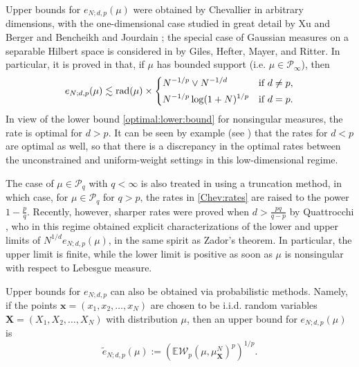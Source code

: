 \documentclass[11pt,reqno]{amsart}
\newcommand{\bx}{{\bm{x}}}
\newcommand{\bX}{{\boldsymbol X}}
\newcommand{\rad}{\mathrm{rad}}
\theoremstyle{definition}
\def\bx{{\boldsymbol x}}
\newcommand{\bm}[1]{\boldsymbol #1}
\renewcommand{\tilde}{\widetilde}
\renewcommand{\tilde}{\widetilde}
\newcommand{\EE}{{\mathbb E}}
\newcommand{\mcl}{\mathcal}
\theoremstyle{definition}
\numberwithin{equation}{section}
\numberwithin{lemma}{section}
\numberwithin{proposition}{section}
\numberwithin{theorem}{section}
\numberwithin{corollary}{section}
\numberwithin{definition}{section}
\numberwithin{remark}{section}
\begin{document}
Upper bounds for $e_{N;d,p}(\mu)$ were obtained by Chevallier \cite{Chev} in arbitrary dimensions, with the one-dimensional case studied in great detail by Xu and Berger \cite{BX} and Bencheikh and Jourdain \cite{BJ}; the special case of Gaussian measures on a separable Hilbert space is considered in \cite{GHMR1} by Giles, Hefter, Mayer, and Ritter. In particular, it is proved in \cite{Chev} that, if $\mu$ has bounded support (i.e. $\mu \in \mcl P_\infty$), then
\begin{equation}\label{Chev:rates}
	e_{N;d,p}(\mu)
	\lesssim \rad(\mu) \times
	\begin{dcases}
		N^{-1/p} \vee N^{-1/d} & \text{if }d \ne p, \\
		N^{-1/p} \log(1+N)^{1/p} & \text{if } d = p.
	\end{dcases}
\end{equation}
In view of the lower bound \eqref{optimal:lower:bound} for nonsingular measures, the rate is optimal for $d > p$. It can be seen by example (see \cite{BX, BJ}) that the rates for $d < p$ are optimal as well, so that there is a discrepancy in the optimal rates between the unconstrained and uniform-weight settings in this low-dimensional regime.

The case of $\mu \in \mcl P_q$ with $q < \infty$ is also treated in \cite{Chev} using a truncation method, in which case, for $\mu \in \mcl P_q$ for $q > p$, the rates in \eqref{Chev:rates} are raised to the power $1 - \frac{p}{q}$. Recently, however, sharper rates were proved when $d > \frac{pq}{q-p}$ by Quattrocchi \cite{Q}, who in this regime obtained explicit characterizations of the lower and upper limits of $N^{1/d} e_{N;d,p}(\mu)$, in the same spirit as Zador's theorem. In particular, the upper limit is finite, while the lower limit is positive as soon as $\mu$ is nonsingular with respect to Lebesgue measure.


Upper bounds for $e_{N;d,p}$ can also be obtained via probabilistic methods. Namely, if the points $\bx = (x_1,x_2, \ldots, x_N)$ are chosen to be i.i.d. random variables $\bX = (X_1,X_2,\ldots, X_N)$ with distribution $\mu$, then an upper bound for $e_{N;d,p}(\mu)$ is
\begin{equation}\label{mean:convergence}
	\tilde e_{N;d,p}(\mu) := \left( \EE  \mcl W_p(\mu, \mu^N_\bX)^p \right)^{1/p}.
\end{equation}
\end{document}
